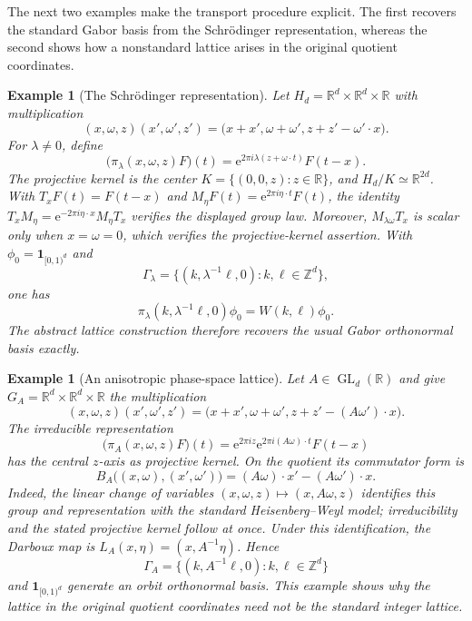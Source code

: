 \documentclass[10pt,a4paper]{amsart}
\numberwithin{equation}{section}
\newtheorem{example}[theorem]{Example}
\newcommand{\R}{\mathbb R}
\newcommand{\e}{\mathrm e}
\begin{document}
The next two examples make the transport procedure explicit.  The first
recovers the standard Gabor basis from the Schr\"odinger representation,
whereas the second shows how a nonstandard lattice arises in the original
quotient coordinates.

\begin{example}[The Schr\"odinger representation]\label{ex:heisenberg}
Let $H_d=\R^d\times\R^d\times\R$ with multiplication
\[
 (x,\omega,z)(x',\omega',z')
 =\bigl(x+x',\omega+\omega',z+z'-\omega'\cdot x\bigr).
\]
For $\lambda\neq0$, define
\begin{equation}\label{eq:Schrodinger-representation}
 \bigl(\pi_\lambda(x,\omega,z)F\bigr)(t)
 =\e^{2\pi i\lambda(z+\omega\cdot t)}F(t-x).
\end{equation}
The projective kernel is the center
$K=\{(0,0,z):z\in\R\}$, and $H_d/K\simeq\R^{2d}$.  With
$T_xF(t)=F(t-x)$ and $M_\eta F(t)=\e^{2\pi i\eta\cdot t}F(t)$, the identity
$T_xM_\eta=\e^{-2\pi i\eta\cdot x}M_\eta T_x$ verifies the displayed
group law.  Moreover, $M_{\lambda\omega}T_x$ is scalar only when
$x=\omega=0$, which verifies the projective-kernel assertion.  With
$\phi_0=\mathbf1_{[0,1)^d}$ and
\[
 \Gamma_\lambda
 =\{(k,\lambda^{-1}\ell,0):k,\ell\in\mathbb Z^d\},
\]
one has
\[
 \pi_\lambda(k,\lambda^{-1}\ell,0)\phi_0
 =W(k,\ell)\phi_0.
\]
The abstract lattice construction therefore recovers the usual Gabor
orthonormal basis exactly.
\end{example}

\begin{example}[An anisotropic phase-space lattice]
\label{ex:anisotropic}
Let $A\in\operatorname{GL}_d(\R)$ and give
$G_A=\R^d\times\R^d\times\R$ the multiplication
\[
 (x,\omega,z)(x',\omega',z')
 =\bigl(x+x',\omega+\omega',
        z+z'-(A\omega')\cdot x\bigr).
\]
The irreducible representation
\[
 \bigl(\pi_A(x,\omega,z)F\bigr)(t)
 =\e^{2\pi iz}\e^{2\pi i(A\omega)\cdot t}F(t-x)
\]
has the central $z$-axis as projective kernel.  On the quotient its
commutator form is
\[
 B_A\bigl((x,\omega),(x',\omega')\bigr)
 =(A\omega)\cdot x'-(A\omega')\cdot x.
\]
Indeed, the linear change of variables
$(x,\omega,z)\mapsto(x,A\omega,z)$ identifies this group and representation
with the standard Heisenberg--Weyl model; irreducibility and the stated
projective kernel follow at once.  Under this identification, the Darboux
map is $L_A(x,\eta)=(x,A^{-1}\eta)$.  Hence
\[
 \Gamma_A
 =\{(k,A^{-1}\ell,0):k,\ell\in\mathbb Z^d\}
\]
and $\mathbf1_{[0,1)^d}$ generate an orbit orthonormal basis.  This example
shows why the lattice in the original quotient coordinates need not be the
standard integer lattice.
\end{example}
\end{document}
